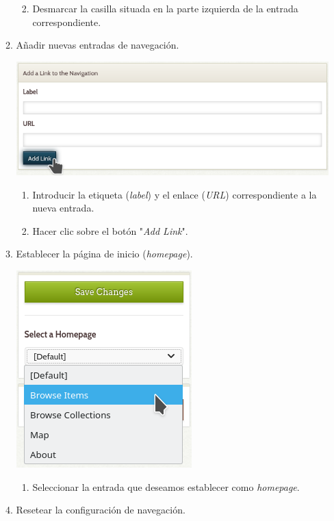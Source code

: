 \documentclass[
]{article}
\providecommand{\tightlist}{%
  \setlength{\itemsep}{0pt}\setlength{\parskip}{0pt}}
\begin{document}
\begin{enumerate}
\begin{enumerate}
    \begin{enumerate}
    \def\labelenumiii{\arabic{enumiii}.}
    \tightlist
    \item
      Desmarcar la casilla situada en la parte izquierda de la entrada
      correspondiente.
    \end{enumerate}
  \item
    Añadir nuevas entradas de navegación.

    \includegraphics{../_static/images/nav-3.png}

    \begin{enumerate}
    \def\labelenumiii{\arabic{enumiii}.}
    \tightlist
    \item
      Introducir la etiqueta (\emph{label}) y el enlace (\emph{URL})
      correspondiente a la nueva entrada.
    \item
      Hacer clic sobre el botón "\emph{Add Link}".
    \end{enumerate}
  \item
    Establecer la página de inicio (\emph{homepage}).

    \includegraphics{../_static/images/nav-4.png}

    \begin{enumerate}
    \def\labelenumiii{\arabic{enumiii}.}
    \tightlist
    \item
      Seleccionar la entrada que deseamos establecer como
      \emph{homepage}.
    \end{enumerate}
  \item
    Resetear la configuración de navegación.


\end{enumerate}
\end{enumerate}
\end{document}
